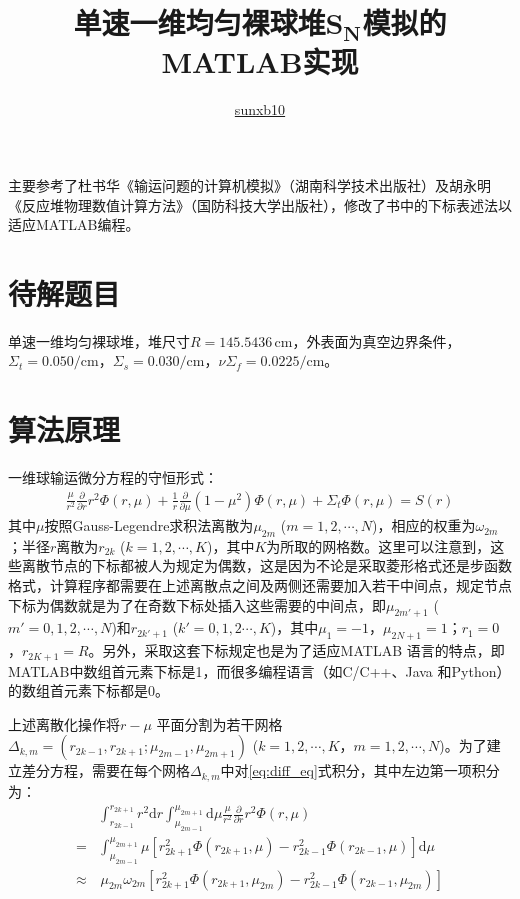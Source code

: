 \documentclass[a4paper,10.5pt]{article}
\title{\heiti 单速一维均匀裸球堆$\boldsymbol{S_{N}}$模拟的MATLAB实现}
\author{\href{mailto:sunxb10@gmail.com}{sunxb10}}
\date{}
\newcommand\md {\mathrm{d}}
\newcommand \kaiti {\CJKfamily{KaiTi}}
\begin{document}
\maketitle
{\kaiti 主要参考了杜书华《输运问题的计算机模拟》（湖南科学技术出版社）及胡永明《反应堆物理数值计算方法》（国防科技大学出版社），修改了书中的下标表述法以适应MATLAB编程。}\par
\section{待解题目}
单速一维均匀裸球堆，堆尺寸$R=145.5436\,\mathrm{cm}$，外表面为真空边界条件，$\Sigma_{t}=0.050/\mathrm{cm}$，$\Sigma_{s}=0.030/\mathrm{cm}$，$\nu\Sigma_{f}=0.0225/\mathrm{cm}$。\par
\section{算法原理}
一维球输运微分方程的守恒形式：
\begin{align}
\frac{\mu}{r^{2}}\frac{\partial}{\partial{}r}r^{2}\Phi(r,\mu)+\frac{1}{r}\frac{\partial}{\partial\mu}(1-\mu^{2})\Phi(r,\mu)+\Sigma_{t}\Phi(r,\mu)
=S(r)\label{eq:diff_eq}
\end{align}
其中$\mu$按照Gauss-Legendre求积法离散为$\mu_{2m}$ ($m=1,2,\cdots,N$)，相应的权重为$\omega_{2m}$；半径$r$离散为$r_{2k}$ ($k=1,2,\cdots,K$)，其中$K$为所取的网格数。这里可以注意到，这些离散节点的下标都被人为规定为偶数，这是因为不论是采取菱形格式还是步函数格式，计算程序都需要在上述离散点之间及两侧还需要加入若干中间点，规定节点下标为偶数就是为了在奇数下标处插入这些需要的中间点，即$\mu_{2m'+1}$ ($m'=0,1,2,\cdots,N$)和$r_{2k'+1}$ ($k'=0,1,2\cdots,K$)，其中$\mu_{1}=-1$，$\mu_{2N+1}=1$；$r_{1}=0$，$r_{2K+1}=R$。另外，采取这套下标规定也是为了适应MATLAB 语言的特点，即MATLAB中数组首元素下标是1，而很多编程语言（如C/C++、Java 和Python）的数组首元素下标都是0。\par
上述离散化操作将$r-\mu$ 平面分割为若干网格$\Delta_{k,m}=(r_{2k-1},r_{2k+1};\mu_{2m-1},\mu_{2m+1})$ ($k=1,2,\cdots,K$，$m=1,2,\cdots,N$)。为了建立差分方程，需要在每个网格$\Delta_{k,m}$中对\eqref{eq:diff_eq}式积分，其中左边第一项积分为：
\begin{align*}
&\int_{r_{2k-1}}^{r_{2k+1}}r^{2}\md{}r\int_{\mu_{2m-1}}^{\mu_{2m+1}}\md\mu\frac{\mu}{r^{2}}\frac{\partial}{\partial{}r}r^{2}\Phi(r,\mu)\\
=&\int_{\mu_{2m-1}}^{\mu_{2m+1}}\mu\left[r_{2k+1}^{2}\Phi(r_{2k+1},\mu)-r_{2k-1}^{2}\Phi(r_{2k-1},\mu)\right]\md\mu\\
\approx&\,\mu_{2m}\omega_{2m}\left[r_{2k+1}^{2}\Phi(r_{2k+1},\mu_{2m})-r_{2k-1}^{2}\Phi(r_{2k-1},\mu_{2m})\right]
\end{align*}
\end{document}
